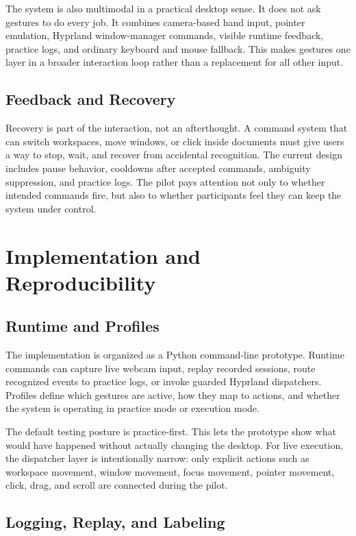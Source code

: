 \documentclass[manuscript]{acmart}
\begin{document}
The system is also multimodal in a practical desktop sense. It does not ask gestures to do every job. It combines camera-based hand input, pointer emulation, Hyprland window-manager commands, visible runtime feedback, practice logs, and ordinary keyboard and mouse fallback. This makes gestures one layer in a broader interaction loop rather than a replacement for all other input.

\subsection{Feedback and Recovery}

Recovery is part of the interaction, not an afterthought. A command system that can switch workspaces, move windows, or click inside documents must give users a way to stop, wait, and recover from accidental recognition. The current design includes pause behavior, cooldowns after accepted commands, ambiguity suppression, and practice logs. The pilot pays attention not only to whether intended commands fire, but also to whether participants feel they can keep the system under control.

\section{Implementation and Reproducibility}

\subsection{Runtime and Profiles}

The implementation is organized as a Python command-line prototype. Runtime commands can capture live webcam input, replay recorded sessions, route recognized events to practice logs, or invoke guarded Hyprland dispatchers. Profiles define which gestures are active, how they map to actions, and whether the system is operating in practice mode or execution mode.

The default testing posture is practice-first. This lets the prototype show what would have happened without actually changing the desktop. For live execution, the dispatcher layer is intentionally narrow: only explicit actions such as workspace movement, window movement, focus movement, pointer movement, click, drag, and scroll are connected during the pilot.

\subsection{Logging, Replay, and Labeling}
\end{document}
